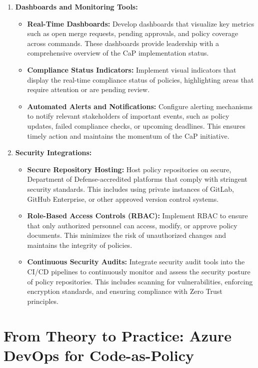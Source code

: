 \documentclass[11pt]{article}
\begin{document}
\begin{enumerate}
    \item \textbf{Dashboards and Monitoring Tools:}
    \begin{itemize}
        \item \textbf{Real-Time Dashboards:} Develop dashboards that visualize key metrics such as open merge requests, pending approvals, and policy coverage across commands. These dashboards provide leadership with a comprehensive overview of the CaP implementation status.
        \item \textbf{Compliance Status Indicators:} Implement visual indicators that display the real-time compliance status of policies, highlighting areas that require attention or are pending review.
        \item \textbf{Automated Alerts and Notifications:} Configure alerting mechanisms to notify relevant stakeholders of important events, such as policy updates, failed compliance checks, or upcoming deadlines. This ensures timely action and maintains the momentum of the CaP initiative.
    \end{itemize}

    \item \textbf{Security Integrations:}
    \begin{itemize}
        \item \textbf{Secure Repository Hosting:} Host policy repositories on secure, Department of Defense-accredited platforms that comply with stringent security standards. This includes using private instances of GitLab, GitHub Enterprise, or other approved version control systems.
        \item \textbf{Role-Based Access Controls (RBAC):} Implement RBAC to ensure that only authorized personnel can access, modify, or approve policy documents. This minimizes the risk of unauthorized changes and maintains the integrity of policies.
        \item \textbf{Continuous Security Audits:} Integrate security audit tools into the CI/CD pipelines to continuously monitor and assess the security posture of policy repositories. This includes scanning for vulnerabilities, enforcing encryption standards, and ensuring compliance with Zero Trust principles.
    \end{itemize}
\end{enumerate}


	\section{From Theory to Practice: Azure DevOps for Code-as-Policy}
\end{document}
